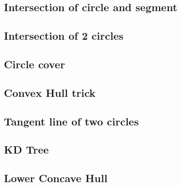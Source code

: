 \documentclass[a4paper,10pt,twocolumn,oneside]{article}
\begin{document}
\subsection{Intersection of circle and segment}


%

\subsection{Intersection of 2 circles}
\subsection{Circle cover}


%

\subsection{Convex Hull trick}


\subsection{Tangent line of two circles}


\subsection{KD Tree}
%


%

\subsection{Lower Concave Hull}

\end{document}
